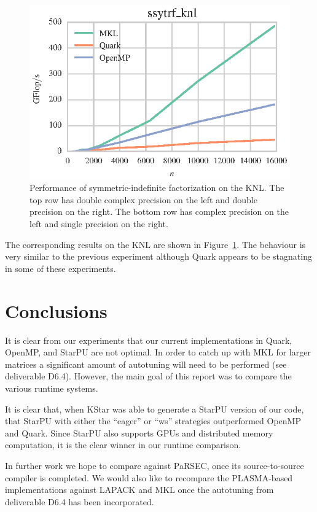 \documentclass[a4paper,12pt]{article}
\begin{document}
\begin{figure}[t]
  \includegraphics[scale=.85]{fig/knl_ram_ssytrf_weak_scaling.eps}
  \caption{Performance of symmetric-indefinite factorization on the KNL.
    The top row has double complex precision on the left and double
    precision on the right.
    The bottom row has complex precision on the left and single
    precision on the right.}
  \label{fig.ldlt_knl_ram}
\end{figure}

The corresponding results on the KNL are shown in
Figure~\ref{fig.ldlt_knl_ram}.
The behaviour is very similar to the previous experiment
although Quark appears to be stagnating in some of these experiments.

\section{Conclusions}
\label{sec.conclusions}

It is clear from our experiments that our current implementations in
Quark, OpenMP, and StarPU are not optimal.
In order to catch up with MKL for larger matrices a significant amount
of autotuning will need to be performed (see deliverable D6.4).
However,
the main goal of this report was to compare the various runtime
systems.

It is clear that,
when KStar was able to generate a StarPU version of our code,
that StarPU with either the ``eager'' or ``ws'' strategies
outperformed OpenMP and Quark.
Since StarPU also supports GPUs and distributed memory computation,
it is the clear winner in our runtime comparison.

In further work we hope to compare against PaRSEC,
once its source-to-source compiler is completed.
We would also like to recompare the PLASMA-based implementations
against LAPACK and MKL once the autotuning from deliverable D6.4
has been incorporated.




\end{document}
